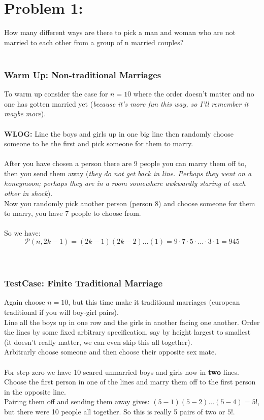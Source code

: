 \documentclass{article}
\begin{document}
 
\section*{Problem 1: }
How many different ways are there to pick a man and woman who are not married to each other from a group of n married couples? 
\\ \\

\subsubsection*{Warm Up: Non-traditional Marriages} 
To warm up consider the case for $n = 10$ where the order doesn't matter and no one has gotten married yet (\textit{because it's more fun this way, so I'll remember it maybe more}).
\\ \\

\textbf{WLOG:} Line the boys and girls up in one big line then randomly choose someone to be the first and pick someone for them to marry. 
\\ \\
After you have chosen a person there are 9 people you can marry them off to, then you send them away (\textit{they do not get back in line. Perhaps they went on a honeymoon; perhaps they are in a room somewhere awkwardly staring at each other in shock}). \\

Now you randomly pick another person (person 8) and choose someone for them to marry, you have 7 people to choose from. \\ \\
So we have: $$\mathcal{P}(n,2k-1) = (2k-1)(2k-2)...(1) = 9\cdot7\cdot5\cdot ... \cdot 3 \cdot1 = 945$$
\\ \\

\subsubsection*{TestCase: Finite Traditional Marriage} 
Again choose $n=10$, but this time make it traditional marriages (european traditional if you will boy-girl pairs). \\
Line all the boys up in one row and the girls in another facing one another.
Order the lines by some fixed arbitrary specification, say by height largest to smallest (it doesn't really matter, we can even skip this all together). \\
Arbitrarly choose someone and then choose their opposite sex mate. 
\\ \\
For step zero we have 10 scared unmarried boys and girls now in \textbf{two} lines. \\
Choose the first person in one of the lines and marry them off to the first person in the opposite line. \\
Pairing them off and sending them away gives: $(5-1)(5-2)...(5-4) = 5!$, but there were 10 people all together. So this is really 5 pairs of two or $5!$. 
\\ \\ 
\end{document}

